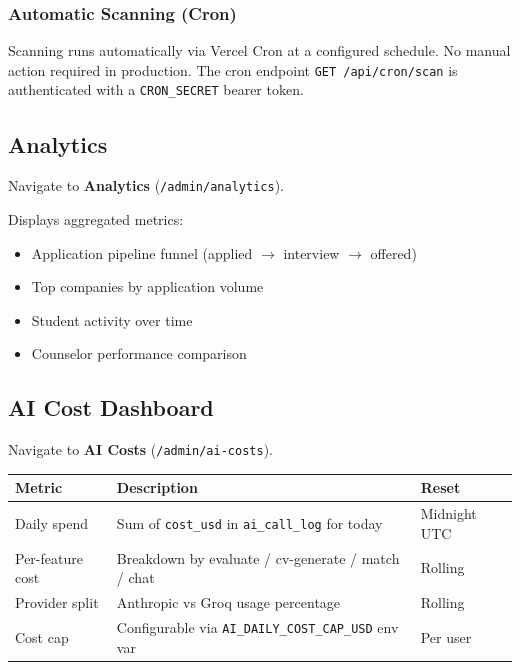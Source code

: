 \documentclass[11pt, a4paper]{article}
\newcommand{\api}[1]{\texttt{\textcolor{accent}{#1}}}
\newcommand{\nav}[1]{\textbf{\textcolor{accent}{#1}}}
\begin{document}
\subsubsection{Automatic Scanning (Cron)}

Scanning runs automatically via Vercel Cron at a configured schedule. No manual action required in production. The cron endpoint \api{GET /api/cron/scan} is authenticated with a \texttt{CRON\_SECRET} bearer token.

\subsection{Analytics}

Navigate to \nav{Analytics} (\texttt{/admin/analytics}).

Displays aggregated metrics:
\begin{itemize}
  \item Application pipeline funnel (applied $\rightarrow$ interview $\rightarrow$ offered)
  \item Top companies by application volume
  \item Student activity over time
  \item Counselor performance comparison
\end{itemize}

\subsection{AI Cost Dashboard}

Navigate to \nav{AI Costs} (\texttt{/admin/ai-costs}).

\begin{center}
\begin{tabular}{lll}
  \toprule
  \textbf{Metric} & \textbf{Description} & \textbf{Reset} \\
  \midrule
  Daily spend     & Sum of \texttt{cost\_usd} in \texttt{ai\_call\_log} for today & Midnight UTC \\
  Per-feature cost & Breakdown by evaluate / cv-generate / match / chat & Rolling \\
  Provider split   & Anthropic vs Groq usage percentage & Rolling \\
  Cost cap         & Configurable via \texttt{AI\_DAILY\_COST\_CAP\_USD} env var & Per user \\
  \bottomrule
\end{tabular}
\end{center}
\end{document}
